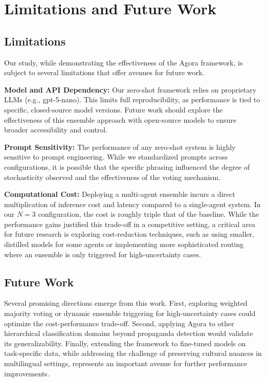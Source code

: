 \section{Limitations and Future Work}

\subsection{Limitations}

Our study, while demonstrating the effectiveness of the Agora framework, is subject to several limitations that offer avenues for future work.

\textbf{Model and API Dependency:} Our zero-shot framework relies on proprietary LLMs (e.g., gpt-5-nano). This limits full reproducibility, as performance is tied to specific, closed-source model versions. Future work should explore the effectiveness of this ensemble approach with open-source models to ensure broader accessibility and control.

\textbf{Prompt Sensitivity:} The performance of any zero-shot system is highly sensitive to prompt engineering. While we standardized prompts across configurations, it is possible that the specific phrasing influenced the degree of stochasticity observed and the effectiveness of the voting mechanism.

\textbf{Computational Cost:} Deploying a multi-agent ensemble incurs a direct multiplication of inference cost and latency compared to a single-agent system. In our $N=3$ configuration, the cost is roughly triple that of the baseline. While the performance gains justified this trade-off in a competitive setting, a critical area for future research is exploring cost-reduction techniques, such as using smaller, distilled models for some agents or implementing more sophisticated routing where an ensemble is only triggered for high-uncertainty cases.

\subsection{Future Work}

Several promising directions emerge from this work. First, exploring weighted majority voting or dynamic ensemble triggering for high-uncertainty cases could optimize the cost-performance trade-off. Second, applying Agora to other hierarchical classification domains beyond propaganda detection would validate its generalizability. Finally, extending the framework to fine-tuned models on task-specific data, while addressing the challenge of preserving cultural nuances in multilingual settings, represents an important avenue for further performance improvements.